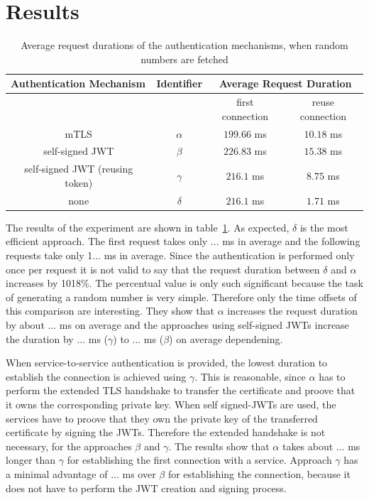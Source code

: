 \section{Results}

\begin{table}[H]
	\centering
\begin{tabular}{c|c|cc}
	\multicolumn{1}{l|}{\textbf{Authentication Mechanism}} & \textbf{Identifier} & \multicolumn{2}{c}{\textbf{Average Request Duration}} \\ \hline
	\multicolumn{1}{c|}{} & & \multicolumn{1}{c|}{first connection} & reuse connection \\ \hline
	mTLS & $\alpha$ & \multicolumn{1}{c|}{$199.66$ ms} & $10.18$ ms \\ \hline
	self-signed JWT & $\beta$ & \multicolumn{1}{c|}{$226.83$ ms} & $15.38$ ms \\ \hline
	self-signed JWT (reusing token) & $\gamma$ & \multicolumn{1}{c|}{$216.1$ ms} & $8.75$ ms \\ \hline 
	none & $\delta$ & \multicolumn{1}{c|}{$216.1$ ms} & $1.71$ ms
\end{tabular}
\caption{Average request durations of the authentication mechanisms, when random numbers are fetched}
\label{tab:experiment_case_1}
\end{table}

The results of the experiment are shown in table~\ref{tab:experiment_case_1}.
As expected, $\delta$ is the most efficient approach.
The first request takes only ... ms in average and the following requests take only 1... ms in average.
Since the authentication is performed only once per request it is not valid to say that the request duration between $\delta$ and $\alpha$ increases by 1018\%.
The percentual value is only such significant because the task of generating a random number is very simple.
Therefore only the time offsets of this comparison are interesting.
They show that $\alpha$ increases the request duration by about ... ms on average and the approaches using self-signed JWTs increase the duration by ... ms ($\gamma$) to ... ms ($\beta$) on average dependening. 

When service-to-service authentication is provided, the lowest duration to establish the connection is achieved using $\gamma$.
This is reasonable, since $\alpha$ has to perform the extended TLS handshake to transfer the certificate and proove that it owns the corresponding private key.
When self signed-JWTs are used, the services have to proove that they own the private key of the transferred certificate by signing the JWTs.
Therefore the extended handshake is not necessary, for the approaches $\beta$ and $\gamma$.
The results show that $\alpha$ takes about ... ms longer than $\gamma$ for establishing the first connection with a service.
Approach $\gamma$ has a minimal advantage of ... ms over $\beta$ for establishing the connection, because it does not have to perform the JWT creation and signing process.

